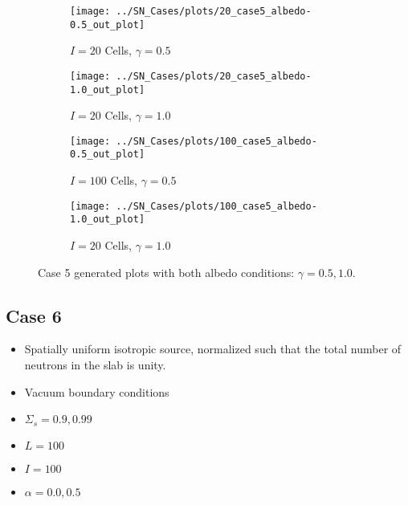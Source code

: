 \documentclass{NE515}
\theoremstyle{definition}
\begin{document}
    \begin{figure}
        \centering
        \begin{subfigure}{0.45\linewidth}
            \centering
            \texttt{[image: ../SN\_Cases/plots/20\_case5\_albedo-0.5\_out\_plot]}
            \caption{$I=20$ Cells, $\gamma = 0.5$}
        \end{subfigure}
        \hfill
        \begin{subfigure}{0.45\linewidth}
            \centering
            \texttt{[image: ../SN\_Cases/plots/20\_case5\_albedo-1.0\_out\_plot]}
            \caption{$I=20$ Cells, $\gamma = 1.0$}
        \end{subfigure}
        \hfill
        \begin{subfigure}{0.45\linewidth}
            \centering
            \texttt{[image: ../SN\_Cases/plots/100\_case5\_albedo-0.5\_out\_plot]}
            \caption{$I=100$ Cells, $\gamma = 0.5$}
        \end{subfigure}
        \hfill
        \begin{subfigure}{0.45\linewidth}
            \centering
            \texttt{[image: ../SN\_Cases/plots/100\_case5\_albedo-1.0\_out\_plot]}
            \caption{$I=20$ Cells, $\gamma = 1.0$}
        \end{subfigure}

        \caption{Case 5 generated plots with both albedo conditions: $\gamma = 0.5, 1.0$.}
        \label{fig:case-5}
    \end{figure}

    \subsection{Case 6}
    \begin{itemize}
        \item Spatially uniform isotropic source, normalized such that the total number of neutrons in the slab is unity.
        \item Vacuum boundary conditions
        \item $\Sigma_s=0.9,0.99$
        \item $L=100$
        \item $I=100$
        \item $\alpha=0.0,0.5$
    \end{itemize}
\end{document}
